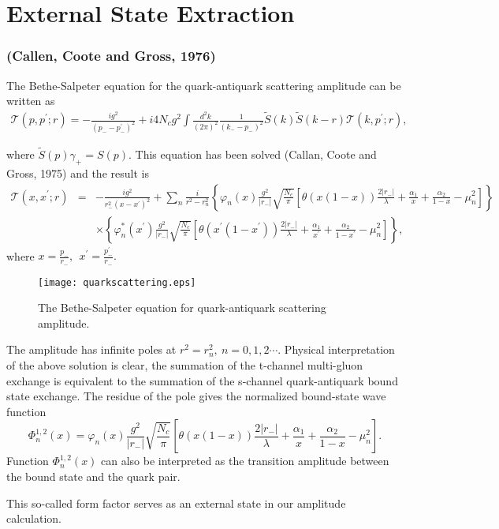 \documentclass[8pt]{beamer}
\begin{document}
\section{External State Extraction}
\begin{frame}
	\frametitle{\insertsectionhead (Callen, Coote and Gross, 1976)}
	The Bethe-Salpeter equation for the quark-antiquark scattering amplitude can be written as
	\begin{eqnarray}
		\mathcal{T}(p,p^\prime;r)=-\frac{ig^2}{(p_{-}-p_{-}^\prime)^2}
		+i4N_c
		g^2\int\frac{d^2k}{(2\pi)^2}\frac{1}{(k_{-}-p_{-})^2}\tilde{S}(k)\tilde{S}(k-r)\mathcal{T}(k,p^\prime;r),\label{quarkeq}
	\end{eqnarray}

	where $\tilde{S}(p)\gamma_+=S(p)$. This equation has been solved (Callan, Coote and Gross, 1975) and the result is
	\small
	\begin{eqnarray}
		\mathcal{T}(x,x^\prime;r)
		&=&-\frac{ig^2}{r_{-}^2(x-x^\prime)^2}+\sum_{n}\frac{i}{r^2-r_{n}^2}\left\{\varphi_{n}(x)\frac{g^2}{|r_{-}|}
		\sqrt{\frac{N_c}{\pi}}\left[\theta(x(1-x))\frac{2|r_{-}|}{\lambda}+\frac{\alpha_1}{x}+\frac{\alpha_2}{1-x}-\mu_{n}^2\right]\right\}\nonumber\\
		&&\times\left\{\varphi_n^{\ast}(x^\prime)\frac{g^2}{|r_{-}|}\sqrt{\frac{N_c}{\pi}}
		\left[\theta(x^\prime(1-x^\prime))\frac{2|r_{-}|}{\lambda}+\frac{\alpha_1}{x^\prime}+\frac{\alpha_2}{1-x^\prime}-\mu_n^2\right]\right\},\label{qqamp}
	\end{eqnarray}
	\normalsize
	where $x=\frac{p_-}{r_-},\ \  x^\prime=\frac{p_-^\prime}{r_-}.$
	\begin{figure}[hbt]
		\begin{center}
			\texttt{[image: quarkscattering.eps]}\\
			\caption{The Bethe-Salpeter equation for quark-antiquark scattering amplitude.}\label{quarkscattering}
		\end{center}
	\end{figure}
\end{frame}

\begin{frame}
	The
	amplitude has infinite poles at $r^2=r_n^2,\ n=0,1,2\cdots$.
	Physical interpretation of the above solution is clear, the
	summation of the t-channel multi-gluon exchange is equivalent to the
	summation of the s-channel quark-antiquark bound state exchange. The
	residue of the pole gives the normalized bound-state wave function
	\begin{equation}
		\Phi^{1,2}_{n}(x)=\varphi_{n}(x)\frac{g^2}{|r_{-}|}
		\sqrt{\frac{N_c}{\pi}}\left[\theta(x(1-x))\frac{2|r_{-}|}{\lambda}+\frac{\alpha_1}{x}+\frac{\alpha_2}{1-x}-\mu_{n}^2\right].
	\end{equation}
	Function $\Phi^{1,2}_n(x)$ can also be interpreted as the transition
	amplitude between the bound state and the quark pair. 

	This so-called form factor serves as an external state in our amplitude calculation. 
\end{frame}
\end{document}
